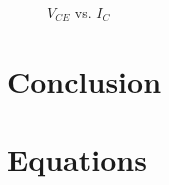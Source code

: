 

\begin{figure}[hbtp]
  \centering
  \resizebox{1.0\textwidth}{!}{}
  \caption{\label{fig:graph} $V_{CE}$ vs. $I_C$}
\end{figure}

\section{Conclusion}
\label{sec:conclusion}

\section{Equations}
\label{sec:equations}

